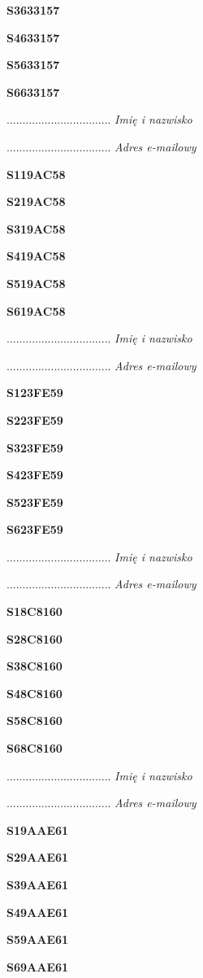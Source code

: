\Large \textbf{S3633157}

\Large \textbf{S4633157}

\Large \textbf{S5633157}

\Large \textbf{S6633157}

.................................
\textit{Imię i nazwisko}

.................................
\textit{Adres e-mailowy}

\Large \textbf{S119AC58}

\Large \textbf{S219AC58}

\Large \textbf{S319AC58}

\Large \textbf{S419AC58}

\Large \textbf{S519AC58}

\Large \textbf{S619AC58}

.................................
\textit{Imię i nazwisko}

.................................
\textit{Adres e-mailowy}

\Large \textbf{S123FE59}

\Large \textbf{S223FE59}

\Large \textbf{S323FE59}

\Large \textbf{S423FE59}

\Large \textbf{S523FE59}

\Large \textbf{S623FE59}

.................................
\textit{Imię i nazwisko}

.................................
\textit{Adres e-mailowy}

\Large \textbf{S18C8160}

\Large \textbf{S28C8160}

\Large \textbf{S38C8160}

\Large \textbf{S48C8160}

\Large \textbf{S58C8160}

\Large \textbf{S68C8160}

.................................
\textit{Imię i nazwisko}

.................................
\textit{Adres e-mailowy}

\Large \textbf{S19AAE61}

\Large \textbf{S29AAE61}

\Large \textbf{S39AAE61}

\Large \textbf{S49AAE61}

\Large \textbf{S59AAE61}

\Large \textbf{S69AAE61}


